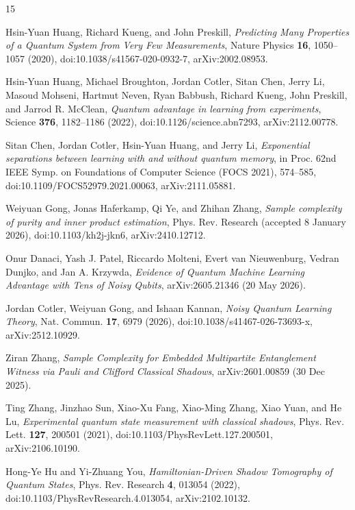 \documentclass[a4paper,superscriptaddress,nofootinbib,onecolumn,nopdfoutputerror]{quantumarticle}
\begin{document}
\begin{thebibliography}{15}

Hsin-Yuan Huang, Richard Kueng, and John Preskill,
\emph{Predicting Many Properties of a Quantum System from Very Few Measurements},
Nature Physics \textbf{16}, 1050--1057 (2020), doi:10.1038/s41567-020-0932-7, arXiv:2002.08953.

Hsin-Yuan Huang, Michael Broughton, Jordan Cotler, Sitan Chen, Jerry Li, Masoud Mohseni, Hartmut Neven, Ryan Babbush, Richard Kueng, John Preskill, and Jarrod R. McClean,
\emph{Quantum advantage in learning from experiments},
Science \textbf{376}, 1182--1186 (2022), doi:10.1126/science.abn7293, arXiv:2112.00778.

Sitan Chen, Jordan Cotler, Hsin-Yuan Huang, and Jerry Li,
\emph{Exponential separations between learning with and without quantum memory},
in Proc. 62nd IEEE Symp. on Foundations of Computer Science (FOCS 2021), 574--585, doi:10.1109/FOCS52979.2021.00063, arXiv:2111.05881.

Weiyuan Gong, Jonas Haferkamp, Qi Ye, and Zhihan Zhang,
\emph{Sample complexity of purity and inner product estimation},
Phys. Rev. Research (accepted 8 January 2026), doi:10.1103/kh2j-jkn6, arXiv:2410.12712.

Onur Danaci, Yash J. Patel, Riccardo Molteni, Evert van Nieuwenburg, Vedran Dunjko, and Jan A. Krzywda,
\emph{Evidence of Quantum Machine Learning Advantage with Tens of Noisy Qubits},
arXiv:2605.21346 (20 May 2026).

Jordan Cotler, Weiyuan Gong, and Ishaan Kannan,
\emph{Noisy Quantum Learning Theory},
Nat. Commun. \textbf{17}, 6979 (2026), doi:10.1038/s41467-026-73693-x, arXiv:2512.10929.

Ziran Zhang,
\emph{Sample Complexity for Embedded Multipartite Entanglement Witness via Pauli and Clifford Classical Shadows},
arXiv:2601.00859 (30 Dec 2025).

Ting Zhang, Jinzhao Sun, Xiao-Xu Fang, Xiao-Ming Zhang, Xiao Yuan, and He Lu,
\emph{Experimental quantum state measurement with classical shadows},
Phys. Rev. Lett. \textbf{127}, 200501 (2021), doi:10.1103/PhysRevLett.127.200501, arXiv:2106.10190.

Hong-Ye Hu and Yi-Zhuang You,
\emph{Hamiltonian-Driven Shadow Tomography of Quantum States},
Phys. Rev. Research \textbf{4}, 013054 (2022), doi:10.1103/PhysRevResearch.4.013054, arXiv:2102.10132.


\end{thebibliography}
\end{document}
